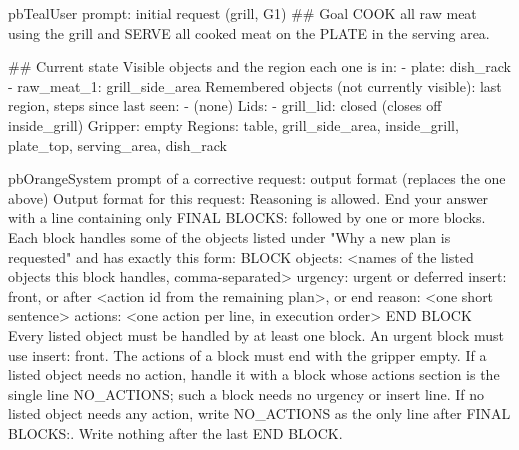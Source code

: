 \begin{promptbox}{pbTeal}{User prompt: initial request (grill, G1)}
## Goal
COOK all raw meat using the grill and SERVE all cooked meat on the PLATE in the serving area.

## Current state
Visible objects and the region each one is in:
- plate: dish_rack
- raw_meat_1: grill_side_area
Remembered objects (not currently visible): last region, steps since last seen:
- (none)
Lids:
- grill_lid: closed (closes off inside_grill)
Gripper: empty
Regions: table, grill_side_area, inside_grill, plate_top, serving_area, dish_rack
\end{promptbox}

\begin{promptbox}{pbOrange}{System prompt of a corrective request: output format (replaces the one above)}
Output format for this request:
Reasoning is allowed. End your answer with a line containing only FINAL BLOCKS: followed by one or more blocks. Each block handles some of the objects listed under "Why a new plan is requested" and has exactly this form:
BLOCK
objects: <names of the listed objects this block handles, comma-separated>
urgency: urgent or deferred
insert: front, or after <action id from the remaining plan>, or end
reason: <one short sentence>
actions:
<one action per line, in execution order>
END BLOCK
Every listed object must be handled by at least one block. An urgent block must use insert: front. The actions of a block must end with the gripper empty. If a listed object needs no action, handle it with a block whose actions section is the single line NO_ACTIONS; such a block needs no urgency or insert line. If no listed object needs any action, write NO_ACTIONS as the only line after FINAL BLOCKS:. Write nothing after the last END BLOCK.
\end{promptbox}

